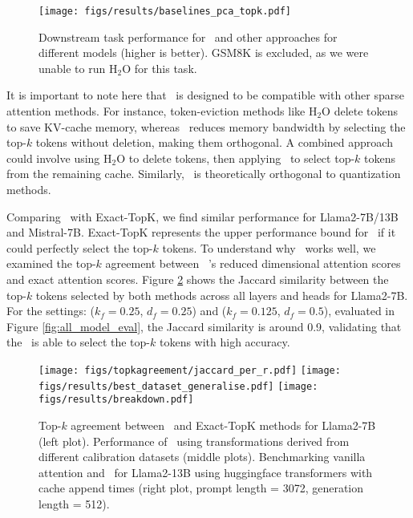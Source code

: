 \begin{figure}[h]
  \centering
    \texttt{[image: figs/results/baselines\_pca\_topk.pdf]}
    \caption{Downstream task performance for \method~and other approaches for different models (higher is better).
     GSM8K is excluded, as we were unable to run H$_2$O for this task.}
    \label{fig:tasks_baseline_eval}
\end{figure}

It is important to note here that \method~is designed to be compatible with other
sparse attention methods. For instance, token-eviction methods like H$_2$O delete tokens to
save KV-cache memory, whereas \method~reduces memory bandwidth by selecting the
top-$k$ tokens without deletion, making them orthogonal. A combined approach
could involve using H$_2$O to delete tokens, then applying \method~to select
top-$k$ tokens from the remaining cache. Similarly, \method~is theoretically
orthogonal to quantization methods.

Comparing \method~with Exact-TopK, we find similar performance for
Llama2-7B/13B and Mistral-7B. Exact-TopK represents the upper performance bound
for \method~if it could perfectly select the top-$k$ tokens. To understand why
\method~works well, we examined the top-$k$ agreement between ~\method's
reduced dimensional attention scores and exact attention scores. Figure
\ref{fig:topkagreement} shows the Jaccard similarity between the top-$k$ tokens
selected by both methods across all layers and heads for Llama2-7B. For the
settings: ($k_f = 0.25$, $d_f = 0.25$) and ($k_f = 0.125$, $d_f = 0.5$),
evaluated in Figure \ref{fig:all_model_eval}, the Jaccard similarity is around
0.9, validating that the \method~is able to select the top-$k$ tokens with high
accuracy.

\begin{figure}[h]
  \centering
  \texttt{[image: figs/topkagreement/jaccard\_per\_r.pdf]}
  \hspace{0.1in}
  \texttt{[image: figs/results/best\_dataset\_generalise.pdf]}
  \texttt{[image: figs/results/breakdown.pdf]}
  \caption{Top-$k$ agreement between \method~and Exact-TopK methods for Llama2-7B (left plot). 
  Performance of \method~using transformations derived from different calibration datasets (middle plots).
  Benchmarking vanilla attention and \method~for Llama2-13B using huggingface transformers with 
  cache append times (right plot, prompt length = 3072, generation length = 512).
  }
  \label{fig:topkagreement}
\end{figure}

